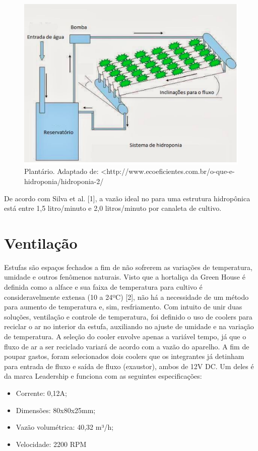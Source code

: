 \begin{figure}[H]
	\centering
	\includegraphics[width=13cm]{figuras/plantario.png}
	\caption{Plantário. Adaptado de: <http://www.ecoeficientes.com.br/o-que-e-hidroponia/hidroponia-2/}
	\label{plantario}
\end{figure}

De acordo com Silva et al. [1], a vazão ideal no para uma estrutura hidropônica está entre 1,5 litro/minuto e 2,0 litros/minuto por canaleta de cultivo.

\section{Ventilação}
Estufas são espaços fechados a fim de não sofrerem as variações de temperatura, umidade e outros fenômenos naturais. Visto que a hortaliça da Green House é definida como a alface e sua faixa de temperatura para cultivo é consideravelmente extensa (10 a 24ºC) [2], não há a necessidade de um método para aumento de temperatura e, sim, resfriamento. Com intuito de unir duas soluções, ventilação e controle de temperatura, foi definido o uso de coolers para reciclar o ar no interior da estufa, auxiliando no ajuste de umidade e na variação de temperatura. A seleção do cooler envolve apenas a variável tempo, já que o fluxo de ar a ser reciclado variará de acordo com a vazão do aparelho. A fim de poupar gastos, foram selecionados dois coolers que os integrantes já detinham para entrada de fluxo e saída de fluxo (exaustor), ambos de 12V DC. Um deles é da marca Leadership e funciona com as seguintes especificações:

\begin{itemize}
	\item Corrente: 0,12A;
	\item Dimensões: 80x80x25mm;
	\item Vazão volumétrica: 40,32 m³/h;
	\item Velocidade: 2200 RPM  
\end{itemize}

